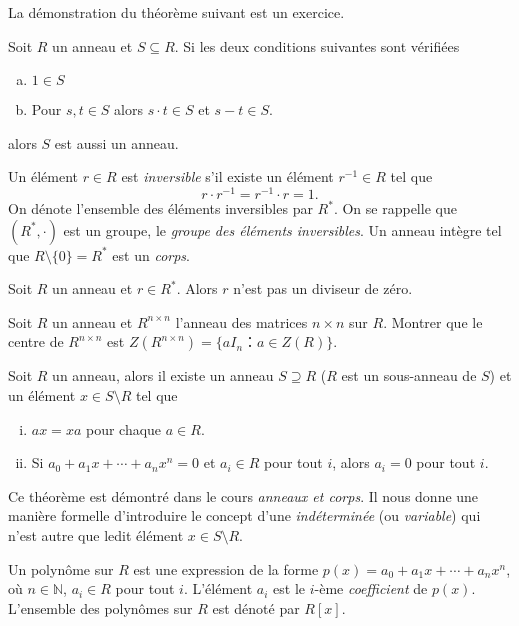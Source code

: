 La démonstration du théorème suivant est un exercice.  
\begin{theorem}
  \label{thr:58}
  Soit $R$ un anneau et $S ⊆R$. Si les deux conditions suivantes sont vérifiées 
  \begin{enumerate}[a)]
  \item $1 ∈ S$
  \item Pour $s,t ∈S$ alors  $s⋅t∈S$   et $s-t ∈S$. 
  \end{enumerate}
  alors $S$ est aussi un anneau. 
\end{theorem}

Un élément $r ∈R$ est \emph{inversible} s'il existe un élément $r^{-1} ∈ R$ tel que
\begin{displaymath}
  r ⋅ r^{-1} = r^{-1} ⋅r = 1. 
\end{displaymath}
On dénote l'ensemble des éléments inversibles par $R^*$. On se rappelle que $(R^*, ⋅)$ est un groupe, le \emph{groupe des éléments inversibles}. Un anneau intègre tel que $R \setminus \{0\} = R^*$ est un \emph{corps}. 

\begin{exercise}
  \label{exe:39}
  Soit $R$ un anneau et $r ∈ R^*$. Alors $r$ n'est pas un diviseur de zéro. 
\end{exercise}

\begin{exercise}
  \label{exe:42}
  Soit $R$ un anneau et $R^{n ×n}$ l'anneau des matrices $n ×n$ sur $R$. Montrer que le centre de $R^{n ×n}$ est $Z(R^{n ×n}) = \{ a I_n ：a ∈Z(R)\}$. 
\end{exercise}

\begin{theorem}
  \label{thr:50}
  Soit $R$ un anneau, alors il existe un anneau $S ⊇R$ ($R$ est un sous-anneau de $S$) et un élément $x ∈ S \setminus R$ tel que
  \begin{enumerate}[(i)]
  \item $a x = x a $ pour chaque $a ∈ R$.
  \item Si 
    $  a_0+ a_1x + \cdots + a_n x^n =0$  et $a_i ∈R$ pour tout $i$,  
    alors  $a_i = 0$ pour tout $i$.
  \end{enumerate}
\end{theorem}
Ce théorème est démontré dans le cours \emph{anneaux et corps}.   Il nous donne une manière formelle d'introduire le concept d'une \emph{indéterminée} (ou  \emph{variable}) qui n'est autre que ledit élément $x ∈ S \setminus R$.  

\begin{definition}
  \label{def:51}
  Un polynôme sur $R$ est une expression de la forme
$p(x) = a_0 + a_1 x + \cdots + a_n x^n$, où $n ∈ℕ$,  $a_i ∈R$ pour tout $i$. L'élément $a_i$ est le $i$-ème \emph{coefficient} de $p(x)$. L'ensemble des polynômes sur $R$ est dénoté par $R[x]$. 
\end{definition}


